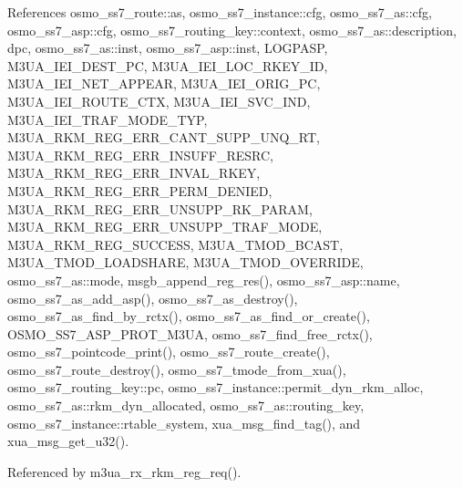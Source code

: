 References osmo\+\_\+ss7\+\_\+route\+::as, osmo\+\_\+ss7\+\_\+instance\+::cfg, osmo\+\_\+ss7\+\_\+as\+::cfg, osmo\+\_\+ss7\+\_\+asp\+::cfg, osmo\+\_\+ss7\+\_\+routing\+\_\+key\+::context, osmo\+\_\+ss7\+\_\+as\+::description, dpc, osmo\+\_\+ss7\+\_\+as\+::inst, osmo\+\_\+ss7\+\_\+asp\+::inst, L\+O\+G\+P\+A\+SP, M3\+U\+A\+\_\+\+I\+E\+I\+\_\+\+D\+E\+S\+T\+\_\+\+PC, M3\+U\+A\+\_\+\+I\+E\+I\+\_\+\+L\+O\+C\+\_\+\+R\+K\+E\+Y\+\_\+\+ID, M3\+U\+A\+\_\+\+I\+E\+I\+\_\+\+N\+E\+T\+\_\+\+A\+P\+P\+E\+AR, M3\+U\+A\+\_\+\+I\+E\+I\+\_\+\+O\+R\+I\+G\+\_\+\+PC, M3\+U\+A\+\_\+\+I\+E\+I\+\_\+\+R\+O\+U\+T\+E\+\_\+\+C\+TX, M3\+U\+A\+\_\+\+I\+E\+I\+\_\+\+S\+V\+C\+\_\+\+I\+ND, M3\+U\+A\+\_\+\+I\+E\+I\+\_\+\+T\+R\+A\+F\+\_\+\+M\+O\+D\+E\+\_\+\+T\+YP, M3\+U\+A\+\_\+\+R\+K\+M\+\_\+\+R\+E\+G\+\_\+\+E\+R\+R\+\_\+\+C\+A\+N\+T\+\_\+\+S\+U\+P\+P\+\_\+\+U\+N\+Q\+\_\+\+RT, M3\+U\+A\+\_\+\+R\+K\+M\+\_\+\+R\+E\+G\+\_\+\+E\+R\+R\+\_\+\+I\+N\+S\+U\+F\+F\+\_\+\+R\+E\+S\+RC, M3\+U\+A\+\_\+\+R\+K\+M\+\_\+\+R\+E\+G\+\_\+\+E\+R\+R\+\_\+\+I\+N\+V\+A\+L\+\_\+\+R\+K\+EY, M3\+U\+A\+\_\+\+R\+K\+M\+\_\+\+R\+E\+G\+\_\+\+E\+R\+R\+\_\+\+P\+E\+R\+M\+\_\+\+D\+E\+N\+I\+ED, M3\+U\+A\+\_\+\+R\+K\+M\+\_\+\+R\+E\+G\+\_\+\+E\+R\+R\+\_\+\+U\+N\+S\+U\+P\+P\+\_\+\+R\+K\+\_\+\+P\+A\+R\+AM, M3\+U\+A\+\_\+\+R\+K\+M\+\_\+\+R\+E\+G\+\_\+\+E\+R\+R\+\_\+\+U\+N\+S\+U\+P\+P\+\_\+\+T\+R\+A\+F\+\_\+\+M\+O\+DE, M3\+U\+A\+\_\+\+R\+K\+M\+\_\+\+R\+E\+G\+\_\+\+S\+U\+C\+C\+E\+SS, M3\+U\+A\+\_\+\+T\+M\+O\+D\+\_\+\+B\+C\+A\+ST, M3\+U\+A\+\_\+\+T\+M\+O\+D\+\_\+\+L\+O\+A\+D\+S\+H\+A\+RE, M3\+U\+A\+\_\+\+T\+M\+O\+D\+\_\+\+O\+V\+E\+R\+R\+I\+DE, osmo\+\_\+ss7\+\_\+as\+::mode, msgb\+\_\+append\+\_\+reg\+\_\+res(), osmo\+\_\+ss7\+\_\+asp\+::name, osmo\+\_\+ss7\+\_\+as\+\_\+add\+\_\+asp(), osmo\+\_\+ss7\+\_\+as\+\_\+destroy(), osmo\+\_\+ss7\+\_\+as\+\_\+find\+\_\+by\+\_\+rctx(), osmo\+\_\+ss7\+\_\+as\+\_\+find\+\_\+or\+\_\+create(), O\+S\+M\+O\+\_\+\+S\+S7\+\_\+\+A\+S\+P\+\_\+\+P\+R\+O\+T\+\_\+\+M3\+UA, osmo\+\_\+ss7\+\_\+find\+\_\+free\+\_\+rctx(), osmo\+\_\+ss7\+\_\+pointcode\+\_\+print(), osmo\+\_\+ss7\+\_\+route\+\_\+create(), osmo\+\_\+ss7\+\_\+route\+\_\+destroy(), osmo\+\_\+ss7\+\_\+tmode\+\_\+from\+\_\+xua(), osmo\+\_\+ss7\+\_\+routing\+\_\+key\+::pc, osmo\+\_\+ss7\+\_\+instance\+::permit\+\_\+dyn\+\_\+rkm\+\_\+alloc, osmo\+\_\+ss7\+\_\+as\+::rkm\+\_\+dyn\+\_\+allocated, osmo\+\_\+ss7\+\_\+as\+::routing\+\_\+key, osmo\+\_\+ss7\+\_\+instance\+::rtable\+\_\+system, xua\+\_\+msg\+\_\+find\+\_\+tag(), and xua\+\_\+msg\+\_\+get\+\_\+u32().



Referenced by m3ua\+\_\+rx\+\_\+rkm\+\_\+reg\+\_\+req().

